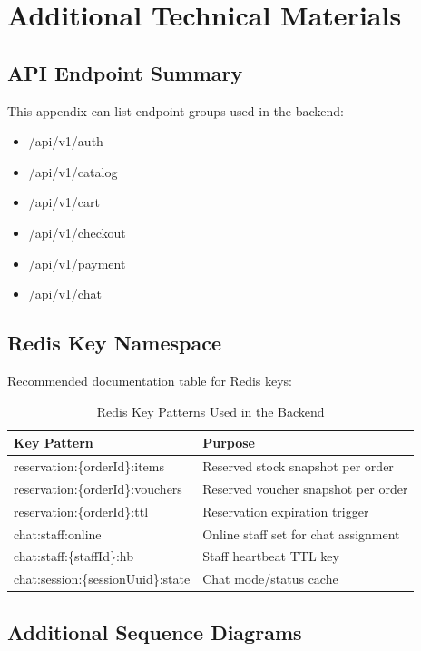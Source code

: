 ﻿\chapter{Additional Technical Materials}
\label{app:additional}

\section{API Endpoint Summary}

This appendix can list endpoint groups used in the backend:
\begin{itemize}
    \item /api/v1/auth
    \item /api/v1/catalog
    \item /api/v1/cart
    \item /api/v1/checkout
    \item /api/v1/payment
    \item /api/v1/chat
\end{itemize}

\section{Redis Key Namespace}

Recommended documentation table for Redis keys:
\begin{table}[H]
\centering
\caption{Redis Key Patterns Used in the Backend}
\label{tab:redis-key-patterns}
\begin{tabular}{|p{4.5cm}|p{7.5cm}|}
\hline
\textbf{Key Pattern} & \textbf{Purpose} \\
\hline
reservation:\{orderId\}:items & Reserved stock snapshot per order \\
\hline
reservation:\{orderId\}:vouchers & Reserved voucher snapshot per order \\
\hline
reservation:\{orderId\}:ttl & Reservation expiration trigger \\
\hline
chat:staff:online & Online staff set for chat assignment \\
\hline
chat:staff:\{staffId\}:hb & Staff heartbeat TTL key \\
\hline
chat:session:\{sessionUuid\}:state & Chat mode/status cache \\
\hline
\end{tabular}
\end{table}

\section{Additional Sequence Diagrams}

